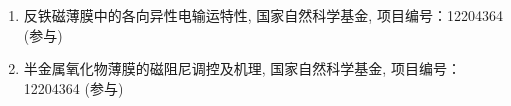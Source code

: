 \begin{project}
\renewcommand{\labelenumi}{[\arabic{enumi}]}
\begin{spacing}{1.25}
   \begin{enumerate}
    \item 反铁磁薄膜中的各向异性电输运特性, 国家自然科学基金, 项目编号：12204364 (参与)
    \item 半金属氧化物薄膜的磁阻尼调控及机理, 国家自然科学基金, 项目编号：12204364 (参与)
   \end{enumerate}
\end{spacing}
\end{project} 
